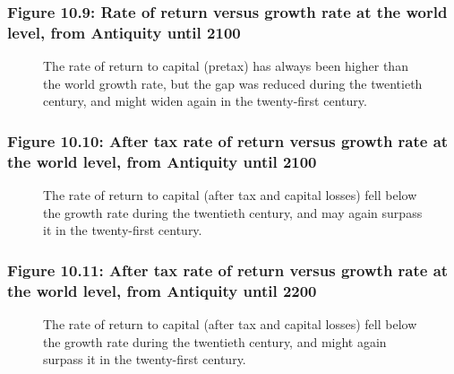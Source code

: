 \documentclass[t]{beamer}\usepackage[]{graphicx}\usepackage[]{color}
\begin{document}
\begin{frame}[label=Figure_10_9]
\frametitle{Figure 10.9: Rate of return versus growth rate at the world level, from Antiquity until 2100}
\begin{figure}[t]
\begin{minipage}[b]{\textwidth}
\centering

\caption{The rate of return to capital (pretax) has always been higher than the world growth rate, but the gap was reduced during the twentieth century, and might widen again in the twenty-first century.}
\end{minipage}
\end{figure}
\end{frame}


\begin{frame}[label=Figure_10_10]
\frametitle{Figure 10.10: After tax rate of return versus growth rate at the world level, from Antiquity until 2100}
\begin{figure}[t]
\begin{minipage}[b]{\textwidth}
\centering

\caption{The rate of return to capital (after tax and capital losses) fell below the growth rate during the twentieth century, and may again surpass it in the twenty-first century.}
\end{minipage}
\end{figure}
\end{frame}


\begin{frame}[label=Figure_10_11]
\frametitle{Figure 10.11: After tax rate of return versus growth rate at the world level, from Antiquity until 2200}
\begin{figure}[t]
\begin{minipage}[b]{\textwidth}
\centering

\caption{The rate of return to capital (after tax and capital losses) fell below the growth rate during the twentieth century, and might again surpass it in the twenty-first century.}
\end{minipage}
\end{figure}
\end{frame}
\end{document}
